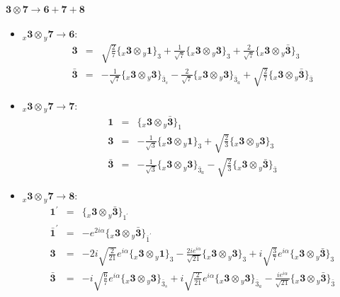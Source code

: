 \documentclass[english]{article}
\newcommand{\rep}[1]{\mathbf{#1}}
\newcommand{\repx}[2]{{}_{#2}\mathbf{#1}}
\newcommand{\subcg}[3]{\big\{ \repx{#1}{x}\otimes\repx{#2}{y}\big\}^{}_{#3}}
\begin{document}
\paragraph*{\Large $\rep{3}\otimes\rep{7}\to\rep{6}+\rep{7}+\rep{8}$}
\begin{itemize}
\item $\repx{3}{x}\otimes\repx{7}{y}\to\rep{6}$:
\begin{eqnarray*}
\rep{3} &=& \sqrt{\frac{2}{7}}\subcg{3}{1}{3}+\frac{1}{\sqrt{7}}\subcg{3}{3}{3}+\frac{2}{\sqrt{7}}\subcg{3}{\bar{3}}{3}
\\
\rep{\bar{3}} &=& -\frac{1}{\sqrt{7}}\subcg{3}{3}{\bar{3}_{s}}-\frac{2}{\sqrt{7}}\subcg{3}{3}{\bar{3}_{a}}+\sqrt{\frac{2}{7}}\subcg{3}{\bar{3}}{\bar{3}}
\end{eqnarray*}
\item $\repx{3}{x}\otimes\repx{7}{y}\to\rep{7}$:
\begin{eqnarray*}
\rep{1} &=& \subcg{3}{\bar{3}}{1}
\\
\rep{3} &=& -\frac{1}{\sqrt{3}}\subcg{3}{1}{3}+\sqrt{\frac{2}{3}}\subcg{3}{3}{3}
\\
\rep{\bar{3}} &=& -\frac{1}{\sqrt{3}}\subcg{3}{3}{\bar{3}_{a}}-\sqrt{\frac{2}{3}}\subcg{3}{\bar{3}}{\bar{3}}
\end{eqnarray*}
\item $\repx{3}{x}\otimes\repx{7}{y}\to\rep{8}$:
\begin{eqnarray*}
\rep{1^{\prime}} &=& \subcg{3}{\bar{3}}{1^{\prime}}
\\
\rep{\bar{1}^{\prime}} &=& -e^{2 i \alpha }\subcg{3}{\bar{3}}{\bar{1}^{\prime}}
\\
\rep{3} &=& -2 i \sqrt{\frac{2}{21}} e^{i \alpha }\subcg{3}{1}{3}-\frac{2 i e^{i \alpha }}{\sqrt{21}}\subcg{3}{3}{3}+i \sqrt{\frac{3}{7}} e^{i \alpha }\subcg{3}{\bar{3}}{3}
\\
\rep{\bar{3}} &=& -i \sqrt{\frac{6}{7}} e^{i \alpha }\subcg{3}{3}{\bar{3}_{s}}+i \sqrt{\frac{2}{21}} e^{i \alpha }\subcg{3}{3}{\bar{3}_{a}}-\frac{i e^{i \alpha }}{\sqrt{21}}\subcg{3}{\bar{3}}{\bar{3}}
\end{eqnarray*}
\end{itemize}
\end{document}
